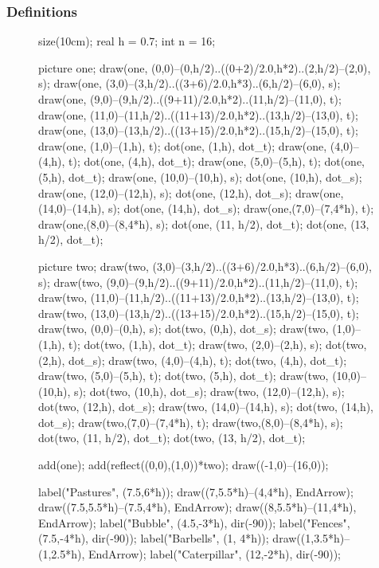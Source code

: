 \documentclass[pdf]{beamer}
\def\ii{\item}
\begin{document}
\begin{frame}[fragile]
	\frametitle{Definitions}

	\begin{figure}[ht]
		\centering
		\begin{asy}
			size(10cm);
			real h = 0.7;
			int n = 16;

			picture one;
			draw(one, (0,0)--(0,h/2)..((0+2)/2.0,h*2)..(2,h/2)--(2,0), s);
			draw(one, (3,0)--(3,h/2)..((3+6)/2.0,h*3)..(6,h/2)--(6,0), s);
			draw(one, (9,0)--(9,h/2)..((9+11)/2.0,h*2)..(11,h/2)--(11,0), t);
			draw(one, (11,0)--(11,h/2)..((11+13)/2.0,h*2)..(13,h/2)--(13,0), t);
			draw(one, (13,0)--(13,h/2)..((13+15)/2.0,h*2)..(15,h/2)--(15,0), t);
			draw(one, (1,0)--(1,h), t);
			dot(one, (1,h), dot_t);
			draw(one, (4,0)--(4,h), t);
			dot(one, (4,h), dot_t);
			draw(one, (5,0)--(5,h), t);
			dot(one, (5,h), dot_t);
			draw(one, (10,0)--(10,h), s);
			dot(one, (10,h), dot_s);
			draw(one, (12,0)--(12,h), s);
			dot(one, (12,h), dot_s);
			draw(one, (14,0)--(14,h), s);
			dot(one, (14,h), dot_s);
			draw(one,(7,0)--(7,4*h), t);
			draw(one,(8,0)--(8,4*h), s);
			dot(one, (11, h/2), dot_t);
			dot(one, (13, h/2), dot_t);

			picture two;
			draw(two, (3,0)--(3,h/2)..((3+6)/2.0,h*3)..(6,h/2)--(6,0), s);
			draw(two, (9,0)--(9,h/2)..((9+11)/2.0,h*2)..(11,h/2)--(11,0), t);
			draw(two, (11,0)--(11,h/2)..((11+13)/2.0,h*2)..(13,h/2)--(13,0), t);
			draw(two, (13,0)--(13,h/2)..((13+15)/2.0,h*2)..(15,h/2)--(15,0), t);
			draw(two, (0,0)--(0,h), s);
			dot(two, (0,h), dot_s);
			draw(two, (1,0)--(1,h), t);
			dot(two, (1,h), dot_t);
			draw(two, (2,0)--(2,h), s);
			dot(two, (2,h), dot_s);
			draw(two, (4,0)--(4,h), t);
			dot(two, (4,h), dot_t);
			draw(two, (5,0)--(5,h), t);
			dot(two, (5,h), dot_t);
			draw(two, (10,0)--(10,h), s);
			dot(two, (10,h), dot_s);
			draw(two, (12,0)--(12,h), s);
			dot(two, (12,h), dot_s);
			draw(two, (14,0)--(14,h), s);
			dot(two, (14,h), dot_s);
			draw(two,(7,0)--(7,4*h), t);
			draw(two,(8,0)--(8,4*h), s);
			dot(two, (11, h/2), dot_t);
			dot(two, (13, h/2), dot_t);

			add(one); add(reflect((0,0),(1,0))*two);
			draw((-1,0)--(16,0));

			label("Pastures", (7.5,6*h));
			draw((7,5.5*h)--(4,4*h), EndArrow);
			draw((7.5,5.5*h)--(7.5,4*h), EndArrow);
			draw((8,5.5*h)--(11,4*h), EndArrow);
			label("Bubble", (4.5,-3*h), dir(-90));
			label("Fences", (7.5,-4*h), dir(-90));
			label("Barbells", (1, 4*h));
			draw((1,3.5*h)--(1,2.5*h), EndArrow);
			label("Caterpillar", (12,-2*h), dir(-90));
		\end{asy}
	\end{figure}
\end{frame}
\end{document}
